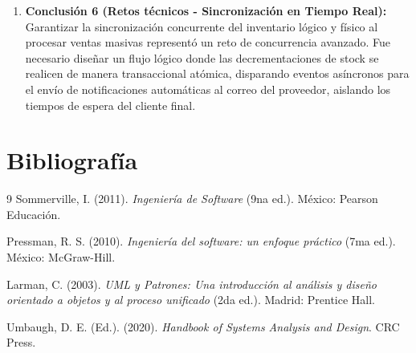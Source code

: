 \documentclass[11pt,a4paper]{article}
\begin{document}
\begin{enumerate}
    \item \textbf{Conclusión 6 (Retos técnicos - Sincronización en Tiempo Real):} \\
    Garantizar la sincronización concurrente del inventario lógico y físico al procesar ventas masivas representó un reto de concurrencia avanzado. Fue necesario diseñar un flujo lógico donde las decrementaciones de stock se realicen de manera transaccional atómica, disparando eventos asíncronos para el envío de notificaciones automáticas al correo del proveedor, aislando los tiempos de espera del cliente final.
\end{enumerate}

\newpage
\section{Bibliografía}
\begin{thebibliography}{9}
    Sommerville, I. (2011). \textit{Ingeniería de Software} (9na ed.). México: Pearson Educación.
    
    Pressman, R. S. (2010). \textit{Ingeniería del software: un enfoque práctico} (7ma ed.). México: McGraw-Hill.
    
    Larman, C. (2003). \textit{UML y Patrones: Una introducción al análisis y diseño orientado a objetos y al proceso unificado} (2da ed.). Madrid: Prentice Hall.
    
    Umbaugh, D. E. (Ed.). (2020). \textit{Handbook of Systems Analysis and Design}. CRC Press.
\end{thebibliography}
\end{document}
